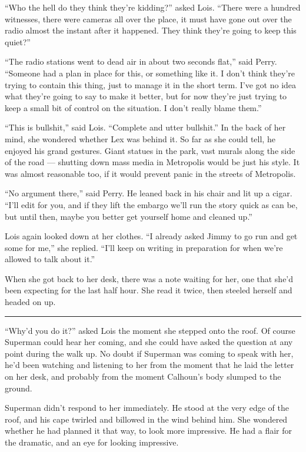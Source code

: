 ``Who the hell do they think they're kidding?'' asked Lois. ``There were
a hundred witnesses, there were cameras all over the place, it must have
gone out over the radio almost the instant after it happened. They think
they're going to keep this quiet?''

``The radio stations went to dead air in about two seconds flat,'' said
Perry. ``Someone had a plan in place for this, or something like it. I
don't think they're trying to contain this thing, just to manage it in
the short term. I've got no idea what they're going to say to make it
better, but for now they're just trying to keep a small bit of control
on the situation. I don't really blame them.''

``This is bullshit,'' said Lois. ``Complete and utter bullshit.'' In the
back of her mind, she wondered whether Lex was behind it. So far as she
could tell, he enjoyed his grand gestures. Giant statues in the park,
vast murals along the side of the road --- shutting down mass media in
Metropolis would be just his style. It was almost reasonable too, if it
would prevent panic in the streets of Metropolis.

``No argument there,'' said Perry. He leaned back in his chair and lit
up a cigar. ``I'll edit for you, and if they lift the embargo we'll run
the story quick as can be, but until then, maybe you better get yourself
home and cleaned up.''

Lois again looked down at her clothes. ``I already asked Jimmy to go run
and get some for me,'' she replied. ``I'll keep on writing in
preparation for when we're allowed to talk about it.''

When she got back to her desk, there was a note waiting for her, one
that she'd been expecting for the last half hour. She read it twice,
then steeled herself and headed on up.

\begin{center}\rule{0.5\linewidth}{\linethickness}\end{center}

``Why'd you do it?'' asked Lois the moment she stepped onto the roof. Of
course Superman could hear her coming, and she could have asked the
question at any point during the walk up. No doubt if Superman was
coming to speak with her, he'd been watching and listening to her from
the moment that he laid the letter on her desk, and probably from the
moment Calhoun's body slumped to the ground.

Superman didn't respond to her immediately. He stood at the very edge of
the roof, and his cape twirled and billowed in the wind behind him. She
wondered whether he had planned it that way, to look more impressive. He
had a flair for the dramatic, and an eye for looking impressive.

